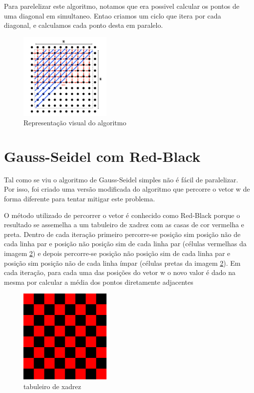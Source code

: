 \documentclass[a4paper]{report}
\begin{document}
Para parelelizar este algoritmo, notamos que era possivel calcular os pontos de
uma diagonal em simultaneo. Entao criamos um ciclo que itera por cada diagonal,
e calculamos cada ponto desta em paralelo.

\begin{figure}[h]
    \centering
        \includegraphics[width=0.4\textwidth]{images/wave.jpeg}
        \caption{Representação visual do algoritmo}
        \label{fig:wave}
\end{figure}

\pagebreak

\section{Gauss-Seidel com Red-Black}

Tal como se viu o algoritmo de Gauss-Seidel simples não é fácil de
paralelizar. Por isso, foi criado uma versão modificada do algoritmo que
percorre o vetor w de forma diferente para tentar mitigar este problema.

O método utilizado de percorrer o vetor é conhecido como Red-Black porque o
resultado se assemelha a um tabuleiro de xadrez com as casas de cor vermelha e
preta. Dentro de cada iteração primeiro percorre-se posição sim posição não de
cada linha par e posição não posição sim de cada linha par (células vermelhas da
imagem \ref{fig:chess}) e depois percorre-se posição não posição sim de cada
linha par e posição sim posição não de cada linha ímpar (células pretas da
imagem \ref{fig:chess}). Em cada iteração, para cada uma das posições do vetor w
o novo valor é dado na mesma por calcular a média dos pontos diretamente
adjacentes

\begin{figure}[h]
    \centering
        \includegraphics[width=0.4\textwidth]{images/chess.jpg}
        \caption{tabuleiro de xadrez}
        \label{fig:chess}
\end{figure}
\end{document}
